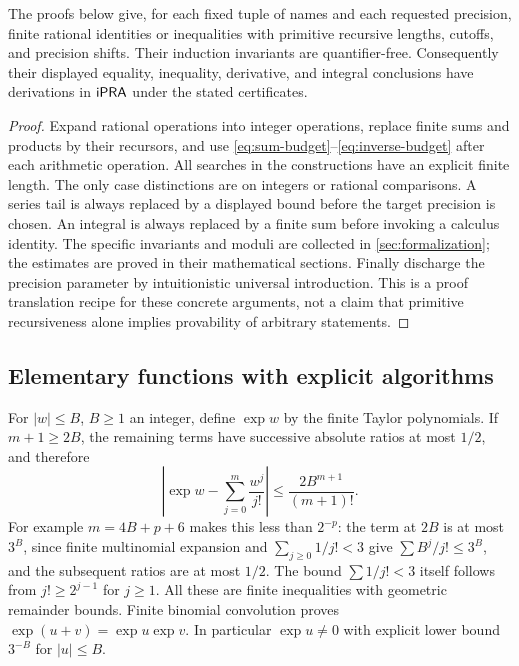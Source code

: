 \begin{proposition}
The proofs below give, for each fixed tuple of names and each requested
precision, finite rational identities or inequalities with primitive
recursive lengths, cutoffs, and precision shifts. Their induction
invariants are quantifier-free. Consequently their displayed equality,
inequality, derivative, and integral conclusions have derivations in
$\mathsf{iPRA}$ under the stated certificates.
\end{proposition}

\begin{proof}
Expand rational operations into integer operations, replace finite sums
and products by their recursors, and use
\eqref{eq:sum-budget}--\eqref{eq:inverse-budget} after each arithmetic
operation. All searches in the constructions have an explicit finite
length. The only case distinctions are on integers or rational
comparisons. A series tail is always replaced by a displayed bound before
the target precision is chosen. An integral is always replaced by a
finite sum before invoking a calculus identity. The specific invariants
and moduli are collected in \cref{sec:formalization}; the estimates are
proved in their mathematical sections. Finally discharge the precision
parameter by intuitionistic universal introduction. This is a proof
translation recipe for these concrete arguments, not a claim that
primitive recursiveness alone implies provability of arbitrary statements.
\end{proof}

\subsection{Elementary functions with explicit algorithms}

For $|w|\le B$, $B\ge1$ an integer, define $\exp w$ by the finite Taylor
polynomials. If $m+1\ge2B$, the remaining terms have successive absolute
ratios at most $1/2$, and therefore
\begin{equation}
 \left|\exp w-\sum_{j=0}^{m}\frac{w^j}{j!}\right|
 \le\frac{2B^{m+1}}{(m+1)!}.\label{eq:exp-tail}
\end{equation}
For example $m=4B+p+6$ makes this less than $2^{-p}$: the term at
$2B$ is at most $3^B$, since finite multinomial expansion and
$\sum_{j\ge0}1/j!<3$ give $\sum B^j/j!\le3^B$, and the subsequent
ratios are at most $1/2$. The bound $\sum1/j!<3$ itself follows from
$j!\ge2^{j-1}$ for $j\ge1$. All these are finite inequalities with
geometric remainder bounds. Finite binomial convolution proves
$\exp(u+v)=\exp u\exp v$. In particular $\exp u\ne0$ with explicit
lower bound $3^{-B}$ for $|u|\le B$.

